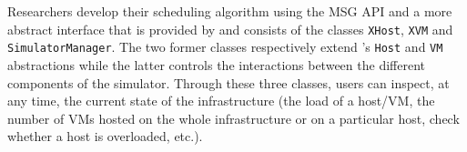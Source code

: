 Researchers develop their scheduling algorithm using the \sg
MSG API and a more abstract interface that is provided by \vmps
and consists of the classes \texttt{XHost}, \texttt{XVM} and
\texttt{SimulatorManager}. The two former classes respectively
extend \sg's \texttt{Host} and \texttt{VM} abstractions while the
latter controls the interactions between the different components of
the simulator.  Through these three classes, users can
inspect, at any time, the current state of the infrastructure (\ie the
load of a host/VM, the number of VMs hosted on the whole
infrastructure or on a particular host, check whether a host is
overloaded, etc.).




\vspace*{-.25cm}

